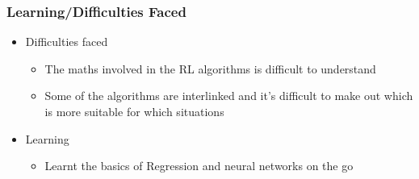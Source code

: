 \documentclass{beamer}
\begin{document}
\begin{frame}
    \frametitle{Learning/Difficulties Faced}
    \begin{itemize}
        \item Difficulties faced
            \begin{itemize}
                \item The maths involved in the RL algorithms is difficult to understand
                \item Some of the algorithms are interlinked and it's difficult to make out which is more suitable for which situations
            \end{itemize}
        \item Learning
            \begin{itemize}
            \item Learnt the basics of Regression and neural networks on the go
            \end{itemize}
    \end{itemize}
\end{frame}
\end{document}
